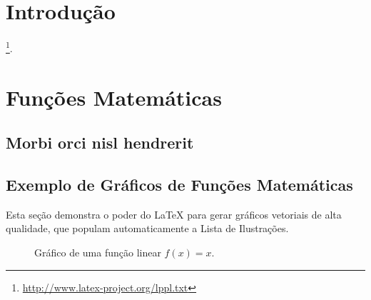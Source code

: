 \documentclass[
	12pt,				%
    oneside,            %
	a4paper,			%
	english,			%
	brazilian,		    %
	]{AcademicoUFT}
\begin{document}
\tableofcontents*
\cleardoublepage


\textual


\chapter*[Introdução]{Introdução}

\lipsum[2] \footnote{\url{http://www.latex-project.org/lppl.txt}}.


\chapter{Funções Matemáticas}

\section{Morbi orci nisl hendrerit}
\lipsum[1] %
\cite{talbot2012}


\newpage %
\section{Exemplo de Gráficos de Funções Matemáticas}

\noindent Esta seção demonstra o poder do LaTeX para gerar gráficos vetoriais de alta qualidade, que populam automaticamente a Lista de Ilustrações.

\begin{figure}[H]
    \centering
    \caption{Gráfico de uma função linear $f(x)=x$.}
    \label{fig:funcao_linear}
\end{figure}
\end{document}
